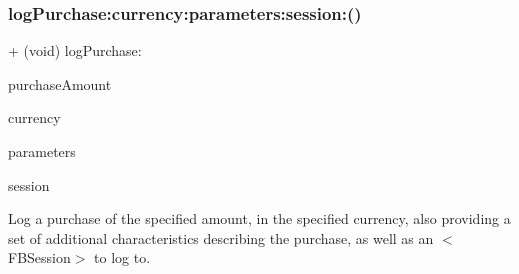 \subsubsection{\texorpdfstring{log\+Purchase\+:currency\+:parameters\+:session\+:()}{logPurchase:currency:parameters:session:()}\hspace{0.1cm}{\footnotesize\ttfamily [2/5]}}
{\footnotesize\ttfamily + (void) log\+Purchase\+: \begin{DoxyParamCaption}\item[{(double)}]{purchase\+Amount }\item[{currency:(N\+S\+String $\ast$)}]{currency }\item[{parameters:(N\+S\+Dictionary $\ast$)}]{parameters }\item[{session:(\hyperlink{interfaceFBSession}{F\+B\+Session} $\ast$)}]{session }\end{DoxyParamCaption}}

Log a purchase of the specified amount, in the specified currency, also providing a set of additional characteristics describing the purchase, as well as an $<$\+F\+B\+Session$>$ to log to.


